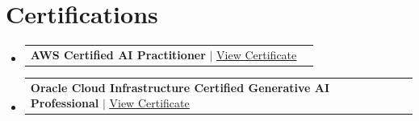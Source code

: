 \documentclass[letterpaper,11pt]{article}
\makeatletter
\newcommand{\resumeProjectHeading}[2]{
        \item
        \begin{tabular*}{0.97\textwidth}{l@{\extracolsep{\fill}}r}
        \small#1 & #2 \\
        \end{tabular*}\vspace{-7pt}
    }
\newcommand{\resumeSubHeadingListStart}{\begin{itemize}[leftmargin=0.15in, label={}]}
\newcommand{\resumeSubHeadingListEnd}{\end{itemize}}
\makeatother
\begin{document}
    \section{Certifications}
    \resumeSubHeadingListStart
        \resumeProjectHeading
            {\textbf{AWS Certified AI Practitioner} $|$ \href{https://www.credly.com/badges/dd24a4a1-e038-4e56-b3e9-f3ad9c105f33/public_url}{\underline{View Certificate}}}{}
        \resumeProjectHeading
            {\textbf{Oracle Cloud Infrastructure Certified Generative AI Professional} $|$ \href{https://catalog-education.oracle.com/ords/certview/sharebadge?id=0512AAC7D2068FE112B1A6E68DB8CBC765B847A44DFBC92B37041027B0254DA6}{\underline{View Certificate}}}{}
    \resumeSubHeadingListEnd

    
\end{document}
